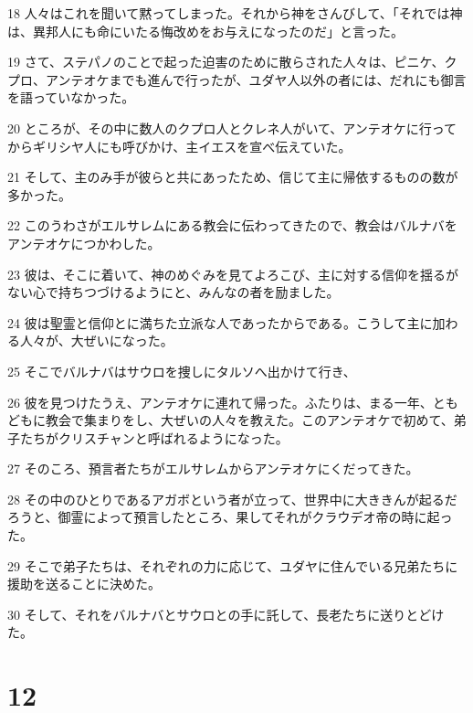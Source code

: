 \par 18 人々はこれを聞いて黙ってしまった。それから神をさんびして、「それでは神は、異邦人にも命にいたる悔改めをお与えになったのだ」と言った。
\par 19 さて、ステパノのことで起った迫害のために散らされた人々は、ピニケ、クプロ、アンテオケまでも進んで行ったが、ユダヤ人以外の者には、だれにも御言を語っていなかった。
\par 20 ところが、その中に数人のクプロ人とクレネ人がいて、アンテオケに行ってからギリシヤ人にも呼びかけ、主イエスを宣べ伝えていた。
\par 21 そして、主のみ手が彼らと共にあったため、信じて主に帰依するものの数が多かった。
\par 22 このうわさがエルサレムにある教会に伝わってきたので、教会はバルナバをアンテオケにつかわした。
\par 23 彼は、そこに着いて、神のめぐみを見てよろこび、主に対する信仰を揺るがない心で持ちつづけるようにと、みんなの者を励ました。
\par 24 彼は聖霊と信仰とに満ちた立派な人であったからである。こうして主に加わる人々が、大ぜいになった。
\par 25 そこでバルナバはサウロを捜しにタルソへ出かけて行き、
\par 26 彼を見つけたうえ、アンテオケに連れて帰った。ふたりは、まる一年、ともどもに教会で集まりをし、大ぜいの人々を教えた。このアンテオケで初めて、弟子たちがクリスチャンと呼ばれるようになった。
\par 27 そのころ、預言者たちがエルサレムからアンテオケにくだってきた。
\par 28 その中のひとりであるアガボという者が立って、世界中に大ききんが起るだろうと、御霊によって預言したところ、果してそれがクラウデオ帝の時に起った。
\par 29 そこで弟子たちは、それぞれの力に応じて、ユダヤに住んでいる兄弟たちに援助を送ることに決めた。
\par 30 そして、それをバルナバとサウロとの手に託して、長老たちに送りとどけた。

\chapter{12}

